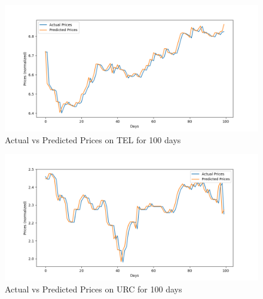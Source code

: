 \begin{figure}[ht]
    \centering
    \includegraphics[width=1\textwidth]{./assets/Chapter_4/DMD_LSTM_crossval/100days/TEL.png}
    \caption{Actual vs Predicted Prices on TEL for 100 days}
    \label{fig:crossval100_TEL}
\end{figure}
\FloatBarrier

\begin{figure}[ht]
    \centering
    \includegraphics[width=1\textwidth]{./assets/Chapter_4/DMD_LSTM_crossval/100days/URC.png}
    \caption{Actual vs Predicted Prices on URC for 100 days}
    \label{fig:crossval100_URC}
\end{figure}
\FloatBarrier